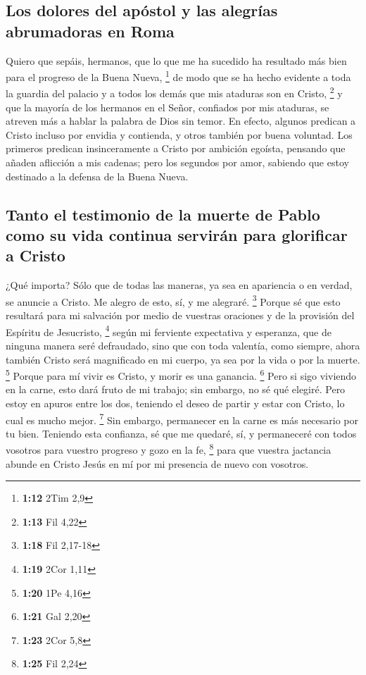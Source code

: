 \begin{paracol}{2}
\hypertarget{los-dolores-del-apuxf3stol-y-las-alegruxedas-abrumadoras-en-roma}{%
\subsection{Los dolores del apóstol y las alegrías abrumadoras en
Roma}\label{los-dolores-del-apuxf3stol-y-las-alegruxedas-abrumadoras-en-roma}}

 Quiero que sepáis, hermanos, que lo que me ha sucedido
ha resultado más bien para el progreso de la Buena Nueva, \footnote{\textbf{1:12}
  2Tim 2,9}  de modo que se ha hecho evidente a toda la
guardia del palacio y a todos los demás que mis ataduras son en Cristo,
\footnote{\textbf{1:13} Fil 4,22}  y que la mayoría de
los hermanos en el Señor, confiados por mis ataduras, se atreven más a
hablar la palabra de Dios sin temor.  En efecto, algunos
predican a Cristo incluso por envidia y contienda, y otros también por
buena voluntad.  Los primeros predican insinceramente a
Cristo por ambición egoísta, pensando que añaden aflicción a mis
cadenas;  pero los segundos por amor, sabiendo que estoy
destinado a la defensa de la Buena Nueva.

\hypertarget{tanto-el-testimonio-de-la-muerte-de-pablo-como-su-vida-continua-serviruxe1n-para-glorificar-a-cristo}{%
\subsection{Tanto el testimonio de la muerte de Pablo como su vida
continua servirán para glorificar a
Cristo}\label{tanto-el-testimonio-de-la-muerte-de-pablo-como-su-vida-continua-serviruxe1n-para-glorificar-a-cristo}}

 ¿Qué importa? Sólo que de todas las maneras, ya sea en
apariencia o en verdad, se anuncie a Cristo. Me alegro de esto, sí, y me
alegraré. \footnote{\textbf{1:18} Fil 2,17-18}  Porque sé
que esto resultará para mi salvación por medio de vuestras oraciones y
de la provisión del Espíritu de Jesucristo, \footnote{\textbf{1:19} 2Cor
  1,11}  según mi ferviente expectativa y esperanza, que
de ninguna manera seré defraudado, sino que con toda valentía, como
siempre, ahora también Cristo será magnificado en mi cuerpo, ya sea por
la vida o por la muerte. \footnote{\textbf{1:20} 1Pe 4,16}
 Porque para mí vivir es Cristo, y morir es una ganancia.
\footnote{\textbf{1:21} Gal 2,20}  Pero si sigo viviendo
en la carne, esto dará fruto de mi trabajo; sin embargo, no sé qué
elegiré.  Pero estoy en apuros entre los dos, teniendo el
deseo de partir y estar con Cristo, lo cual es mucho mejor. \footnote{\textbf{1:23}
  2Cor 5,8}  Sin embargo, permanecer en la carne es más
necesario por tu bien.  Teniendo esta confianza, sé que
me quedaré, sí, y permaneceré con todos vosotros para vuestro progreso y
gozo en la fe, \footnote{\textbf{1:25} Fil 2,24}  para
que vuestra jactancia abunde en Cristo Jesús en mí por mi presencia de
nuevo con vosotros.


\end{paracol}
